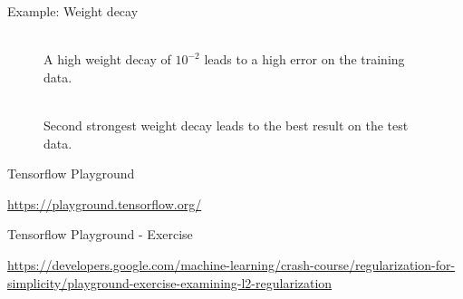 \begin{vbframe}{Example: Weight decay}
\begin{figure}
\centering
{}
\\
A high weight decay of $10^{-2}$ leads to a high error on the training data.
\end{figure}

\framebreak

\begin{figure}
\centering
{}
\\
Second strongest weight decay leads to the best result on the test data.
\end{figure}
\end{vbframe}
  
\begin{frame}{Tensorflow Playground}
\begin{figure}
\centering
{}
  \end{figure}
  \scriptsize
  \url{https://playground.tensorflow.org/}
\end{frame}

\begin{frame}{Tensorflow Playground - Exercise}
  \begin{figure}
    \centering
  \end{figure}
  \scriptsize
  \url{https://developers.google.com/machine-learning/crash-course/regularization-for-simplicity/playground-exercise-examining-l2-regularization}
\end{frame}


\endlecture
